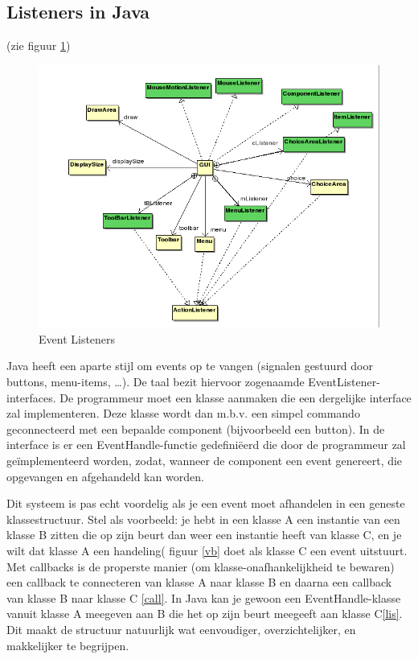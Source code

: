 \documentclass[a4paper,11pt,oneside, titlepage]{article}
\begin{document}
\subsection{Listeners in Java }
(zie figuur \ref{iLis})
\begin{figure}[htbp]
\centering
\includegraphics[scale=0.4]{./UML2/Listeners.png}
\caption{Event Listeners}\label{iLis}
\end{figure}
Java heeft een aparte stijl om events op te vangen (signalen gestuurd door buttons, menu-items,
\ldots). De taal bezit hiervoor zogenaamde EventListener-interfaces. De programmeur
moet een klasse aanmaken die een dergelijke interface zal implementeren. Deze klasse wordt dan
m.b.v. een simpel commando geconnecteerd met een bepaalde component (bijvoorbeeld een button).
In de interface is er een EventHandle-functie gedefini\"eerd die door de programmeur zal 
ge\"implementeerd worden, zodat, wanneer de component een event genereert,
die opgevangen en afgehandeld kan worden.\newline

Dit systeem is pas echt voordelig als je een event moet afhandelen in een geneste klassestructuur. 
Stel als voorbeeld: je hebt in een klasse A een instantie van een klasse B zitten
die op zijn beurt dan weer een instantie heeft van klasse C, en je wilt dat klasse A een handeling( figuur \ref{vb}
doet als klasse C een event uitstuurt.
Met callbacks is de properste manier (om klasse-onafhankelijkheid te bewaren) een callback 
te connecteren van klasse A naar klasse B en daarna een callback van klasse B naar klasse C \ref{call}.
In Java kan je gewoon een EventHandle-klasse vanuit klasse A meegeven aan B die het op zijn 
beurt meegeeft aan klasse C\ref{lis}. Dit maakt de structuur natuurlijk wat eenvoudiger, overzichtelijker, en makkelijker te begrijpen.\newline \newline
\end{document}
